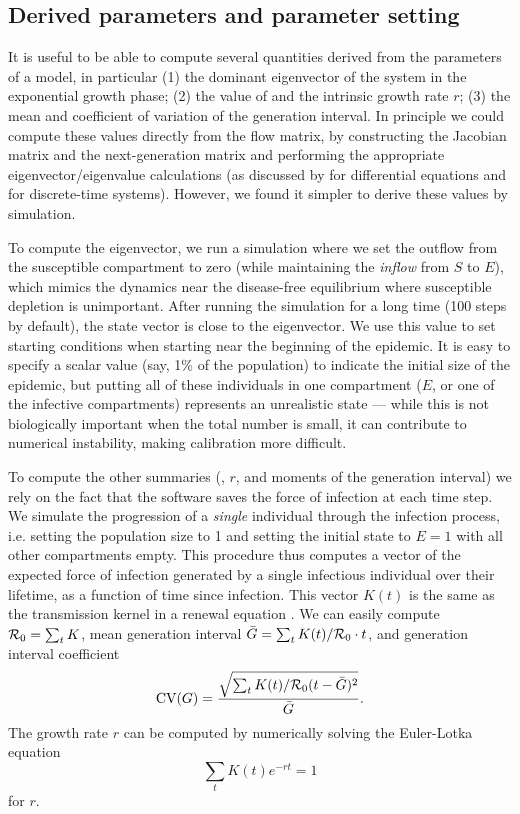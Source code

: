 \documentclass[12pt]{article}\usepackage[]{graphicx}\usepackage[]{color}
\begin{document}

\subsection*{Derived parameters and parameter setting}

It is useful to be able to compute several quantities derived from the parameters of a model, in particular (1) the dominant eigenvector of the system in the exponential growth phase; (2) the value of \Rzero and the intrinsic growth rate $r$; (3) the mean and coefficient of variation of the generation interval. In principle we could compute these values directly from the flow matrix, by constructing the Jacobian matrix and the next-generation matrix and performing the appropriate eigenvector/eigenvalue calculations (as discussed by \cite{VandWatm02} for differential equations and \cite{Casw00} for discrete-time systems). However, we found it simpler to derive these values by simulation.

To compute the eigenvector, we run a simulation where we set the outflow from the susceptible compartment to zero (while maintaining the \emph{inflow} from $S$ to $E$), which mimics the dynamics near the disease-free equilibrium where susceptible depletion is unimportant. After running the simulation for a long time (100 steps by default), the state vector is close to the eigenvector.  We use this value to set starting conditions when starting near the beginning of the epidemic. It is easy to specify a scalar value (say, 1\% of the population) to indicate the initial size of the epidemic, but putting all of these individuals in one compartment ($E$, or one of the infective compartments) represents an unrealistic state --- while this is not biologically important when the total number is small, it can contribute to numerical instability, making calibration more difficult.

To compute the other summaries (\Rzero, $r$, and moments of the generation interval) we rely on the fact that the software saves the force of infection at each time step. We simulate the progression of a \emph{single} individual through the infection process, i.e. setting the population size to 1 and setting the initial state to $E=1$ with all other compartments empty. This procedure thus computes a vector of the expected force of infection generated by a single infectious individual over their lifetime, as a function of time since infection. This vector $K(t)$ is the same as the transmission kernel in a renewal equation \cite{Cham+18}. We can easily compute ${\mathcal R}_0 = \sum_t K$, mean generation interval  $\bar G = \sum_t K(t)/{\mathcal R}_0 \cdot t$, and generation interval coefficient
\[
\textrm{CV}(G) = \frac{\sqrt{\sum_t K(t)/{\mathcal R}_0 (t- \bar G)^2}}{\bar G} .
\]
The growth rate $r$ can be computed by numerically solving the Euler-Lotka equation
\[
\sum_t  K(t) e^{-r t} = 1
\]
for $r$.
\end{document}
